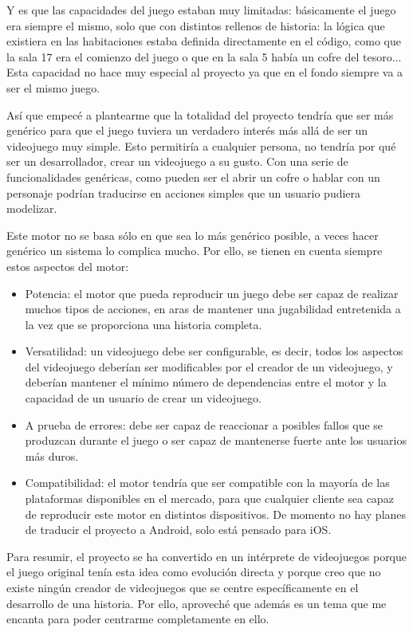 Y es que las capacidades del juego estaban muy limitadas: básicamente el juego era siempre el mismo, solo que con distintos rellenos de historia: la lógica que existiera en las habitaciones estaba definida directamente en el código, como que la sala 17 era el comienzo del juego o que en la sala 5 había un cofre del tesoro...
Esta capacidad no hace muy especial al proyecto ya que en el fondo siempre va a ser el mismo juego.

Así que empecé a plantearme que la totalidad del proyecto tendría que ser más genérico para que el juego tuviera un verdadero interés más allá de ser un videojuego muy simple. Esto permitiría a cualquier persona, no tendría por qué ser un desarrollador, crear un videojuego a su gusto.
Con una serie de funcionalidades genéricas, como pueden ser el abrir un cofre o hablar con un personaje podrían traducirse en acciones simples que un usuario pudiera modelizar.

Este motor no se basa sólo en que sea lo más genérico posible, a veces hacer genérico un sistema lo complica mucho. Por ello, se tienen en cuenta siempre estos aspectos del motor:
\begin{itemize}
	\item Potencia: el motor que pueda reproducir un juego debe ser capaz de realizar muchos tipos de acciones, en aras de mantener una jugabilidad entretenida a la vez que se proporciona una historia completa.
	\item Versatilidad: un videojuego debe ser configurable, es decir, todos los aspectos del videojuego deberían ser modificables por el creador de un videojuego, y deberían mantener el mínimo número de dependencias entre el motor y la capacidad de un usuario de crear un videojuego. 
	\item A prueba de errores: debe ser capaz de reaccionar a posibles fallos que se produzcan durante el juego o ser capaz de mantenerse fuerte ante los usuarios más duros.
	\item Compatibilidad: el motor tendría que ser compatible con la mayoría de las plataformas disponibles en el mercado, para que cualquier cliente sea capaz de reproducir este motor en distintos dispositivos. De momento no hay planes de traducir el proyecto a Android, solo está pensado para iOS.
\end{itemize}

Para resumir, el proyecto se ha convertido en un intérprete de videojuegos porque el juego original tenía esta idea como evolución directa y porque creo que no existe ningún creador de videojuegos que se centre específicamente en el desarrollo de una historia. Por ello, aproveché que además es un tema que me encanta para poder centrarme completamente en ello.


